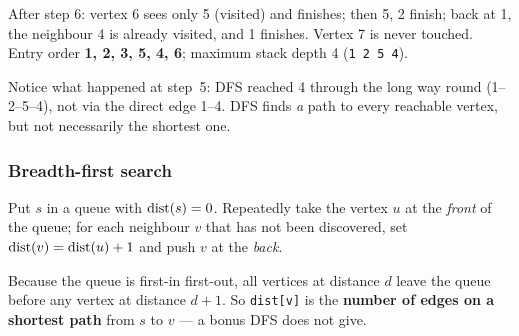 \begin{tracebox}[DFS on $G_3$ from $s=1$, step by step]
\begin{center}
\end{center}

After step 6: vertex 6 sees only 5 (visited) and finishes; then 5, 2 finish; back at 1, the neighbour 4 is already visited, and 1 finishes. Vertex 7 is never touched. Entry order \textbf{1, 2, 3, 5, 4, 6}; maximum stack depth 4 (\texttt{1 2 5 4}).
\end{tracebox}

Notice what happened at step~5: DFS reached 4 through the long way round (1--2--5--4), not via the direct edge 1--4. DFS finds \emph{a} path to every reachable vertex, but not necessarily the shortest one.

\subsubsection*{Breadth-first search}

\begin{algorithmbox}
Put $s$ in a queue with $\operatorname{dist}(s)=0$. Repeatedly take the vertex $u$ at the \emph{front} of the queue; for each neighbour $v$ that has not been discovered, set $\operatorname{dist}(v)=\operatorname{dist}(u)+1$ and push $v$ at the \emph{back}.

Because the queue is first-in first-out, all vertices at distance $d$ leave the queue before any vertex at distance $d+1$. So \texttt{dist[v]} is the \textbf{number of edges on a shortest path} from $s$ to $v$ --- a bonus DFS does not give.
\end{algorithmbox}

